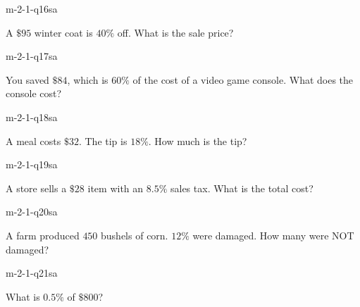 \begin{practiceQuestion}{m-2-1-q16}{sa}
\begin{questionText}
A $\$95$ winter coat is $40\%$ off. What is the sale price?
\end{questionText}
\end{practiceQuestion}

\begin{practiceQuestion}{m-2-1-q17}{sa}
\begin{questionText}
You saved $\$84$, which is $60\%$ of the cost of a video game console. What does the console cost?
\end{questionText}
\end{practiceQuestion}

\begin{practiceQuestion}{m-2-1-q18}{sa}
\begin{questionText}
A meal costs $\$32$. The tip is $18\%$. How much is the tip?
\end{questionText}
\end{practiceQuestion}

\begin{practiceQuestion}{m-2-1-q19}{sa}
\begin{questionText}
A store sells a $\$28$ item with an $8.5\%$ sales tax. What is the total cost?
\end{questionText}
\end{practiceQuestion}

\begin{practiceQuestion}{m-2-1-q20}{sa}
\begin{questionText}
A farm produced $450$ bushels of corn. $12\%$ were damaged. How many were NOT damaged?
\end{questionText}
\end{practiceQuestion}

\begin{practiceQuestion}{m-2-1-q21}{sa}
\begin{questionText}
What is $0.5\%$ of $\$800$?
\end{questionText}
\end{practiceQuestion}

